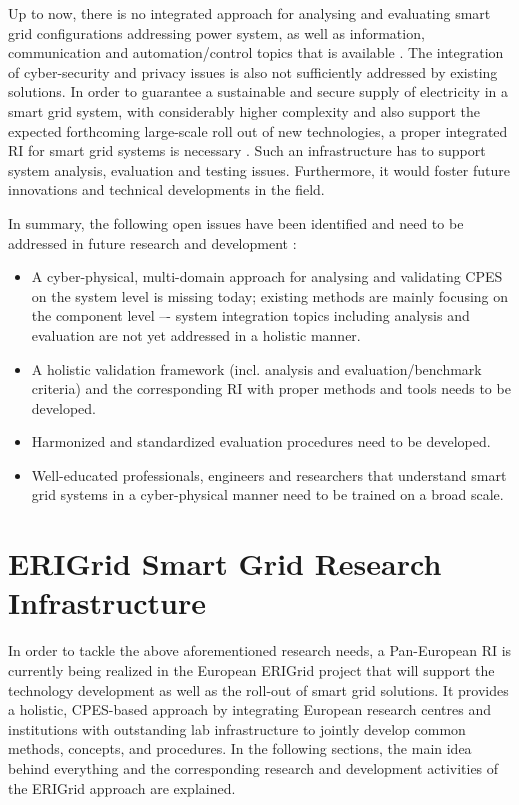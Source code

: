 \documentclass[runningheads,a4paper]{llncs}
\begin{document}
Up to now, there is no integrated approach for analysing and evaluating smart grid configurations addressing power system, as well as information, communication and automation/control topics that is available \cite{Strasser:2017}. The integration of cyber-security and privacy issues is also not sufficiently addressed by existing solutions. In order to guarantee a sustainable and secure supply of electricity in a smart grid system, with considerably higher complexity and also support the expected forthcoming large-scale roll out of new technologies, a proper integrated RI for smart grid systems is necessary \cite{Strasser:2017}. Such an infrastructure has to support system analysis, evaluation and testing issues. Furthermore, it would foster future innovations and technical developments in the field. 

In summary, the following open issues have been identified and need to be addressed in future research and development \cite{EUR:2011,IEA:2013,SG:2012,Brunner:2016,Strasser:2017}:

\begin{itemize}
	\item A cyber-physical, multi-domain approach for analysing and validating CPES on the system level is missing today; existing methods are mainly focusing on the component level –- system integration topics including analysis and evaluation are not yet addressed in a holistic manner. 
	\item A holistic validation framework (incl. analysis and evaluation/benchmark criteria) and the corresponding RI with proper methods and tools needs to be developed. 
	\item Harmonized and standardized evaluation procedures need to be developed.
	\item Well-educated professionals, engineers and researchers that understand smart grid systems in a cyber-physical manner need to be trained on a broad scale.
\end{itemize}
%
%
\section{ERIGrid Smart Grid Research Infrastructure}
\label{sec:integrated_research_infrastructure}
    
In order to tackle the above aforementioned research needs, a Pan-European RI is currently being realized in the European ERIGrid project that will support the technology development as well as the roll-out of smart grid solutions. It provides a holistic, CPES-based approach by integrating European research centres and institutions with outstanding lab infrastructure to jointly develop common methods, concepts, and procedures. In the following sections, the main idea behind everything and the corresponding research and development activities of the ERIGrid approach are explained.
\end{document}
